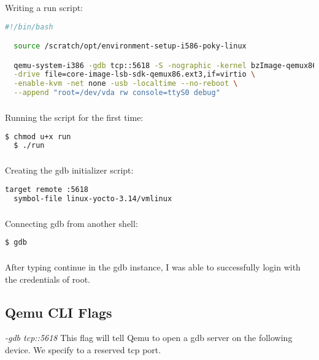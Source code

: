 \documentclass[10pt,draftclsnofoot,onecolumn]{IEEEtran}
\begin{document}
\subsubsection{}
Writing a run script:
\begin{lstlisting}[language=bash]
  #!/bin/bash

  source /scratch/opt/environment-setup-i586-poky-linux

  qemu-system-i386 -gdb tcp::5618 -S -nographic -kernel bzImage-qemux86.bin \
  -drive file=core-image-lsb-sdk-qemux86.ext3,if=virtio \
  -enable-kvm -net none -usb -localtime --no-reboot \
  --append "root=/dev/vda rw console=ttyS0 debug"
\end{lstlisting}

\subsubsection{}
Running the script for the first time:
\begin{lstlisting}[language=bash]
  $ chmod u+x run
  $ ./run
\end{lstlisting}

\subsubsection{}
Creating the gdb initializer script:
\begin{lstlisting}[language=bash]
  target remote :5618
  symbol-file linux-yocto-3.14/vmlinux
\end{lstlisting}

\subsubsection{}
Connecting gdb from another shell:
\begin{lstlisting}[language=bash]
  $ gdb
\end{lstlisting}

\subsubsection{}
After typing continue in the gdb instance, I was able to successfully login with the credentials of root.

\subsection{Qemu CLI Flags}
\textit{-gdb tcp::5618}
This flag will tell Qemu to open a gdb server on the following device.
We specify to a reserved tcp port.
\end{document}
